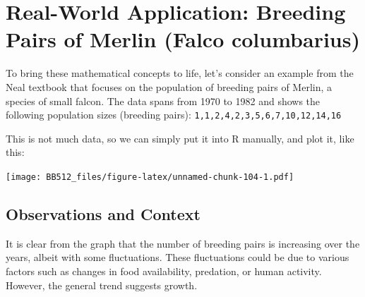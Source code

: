 \documentclass[
  a4paper]{book}
\newenvironment{Shaded}{\begin{snugshade}}{\end{snugshade}}
\newcommand{\AttributeTok}[1]{\textcolor[rgb]{0.13,0.29,0.53}{#1}}
\newcommand{\DecValTok}[1]{\textcolor[rgb]{0.00,0.00,0.81}{#1}}
\newcommand{\FunctionTok}[1]{\textcolor[rgb]{0.13,0.29,0.53}{\textbf{#1}}}
\newcommand{\NormalTok}[1]{#1}
\newcommand{\OtherTok}[1]{\textcolor[rgb]{0.56,0.35,0.01}{#1}}
\newcommand{\SpecialCharTok}[1]{\textcolor[rgb]{0.81,0.36,0.00}{\textbf{#1}}}
\newcommand{\StringTok}[1]{\textcolor[rgb]{0.31,0.60,0.02}{#1}}
\begin{document}
\hypertarget{real-world-application-breeding-pairs-of-merlin-falco-columbarius}{%
\section{Real-World Application: Breeding Pairs of Merlin (Falco columbarius)}\label{real-world-application-breeding-pairs-of-merlin-falco-columbarius}}

To bring these mathematical concepts to life, let's consider an example from the Neal textbook that focuses on the population of breeding pairs of Merlin, a species of small falcon. The data spans from 1970 to 1982 and shows the following population sizes (breeding pairs): \texttt{1,1,2,4,2,3,5,6,7,10,12,14,16}

This is not much data, so we can simply put it into R manually, and plot it, like this:

\begin{Shaded}
\end{Shaded}

\texttt{[image: BB512\_files/figure-latex/unnamed-chunk-104-1.pdf]}

\hypertarget{observations-and-context}{%
\subsection{Observations and Context}\label{observations-and-context}}

It is clear from the graph that the number of breeding pairs is increasing over the years, albeit with some fluctuations. These fluctuations could be due to various factors such as changes in food availability, predation, or human activity. However, the general trend suggests growth.
\end{document}
